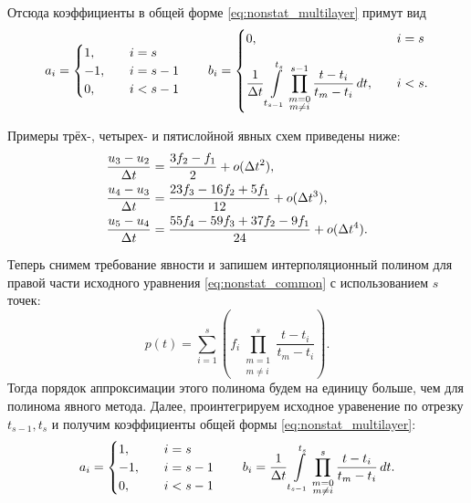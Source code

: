 Отсюда коэффициенты в общей форме \cref{eq:nonstat_multilayer} примут вид
\begin{equation*}
a_i = 
\begin{cases}
1,  &\quad i = s\\
-1, &\quad i = s-1\\
0,  &\quad i < s-1
\end{cases}
\qquad
b_i =
\begin{cases}
0, &\quad i = s\\[10pt]
\displaystyle\frac{1}{\Delta t}\int\limits_{t_{s-1}}^{t_s} \prod \limits_{\substack{m=0\\m\neq i}}^{s-1} \frac{t - t_i}{t_m - t_i}\, dt, &\quad i < s.
\end{cases}
\end{equation*}

Примеры трёх-, четырех- и пятислойной явных схем приведены ниже:
\begin{align*}
&\frac{u_3 - u_2}{\Delta t} = \frac{3f_2 - f_1}{2} + o(\Delta t^2),\\
&\frac{u_4 - u_3}{\Delta t} = \frac{23 f_3 - 16 f_2 + 5 f_1}{12} + o(\Delta t^3),\\
&\frac{u_5 - u_4}{\Delta t} = \frac{55 f_4 - 59 f_3 + 37 f_2 - 9 f_1}{24} + o(\Delta t^4).
\end{align*}

Теперь снимем требование явности и запишем интерполяционный полином для правой части исходного уравнения \cref{eq:nonstat_common} с использованием $s$ точек:
\begin{equation*}
p(t) = \sum\limits_{i=1}^{s}\left(f_i \prod\limits_{\substack{m=1\\m \neq i}}^{s} \frac{t - t_i}{t_m - t_i} \right).
\end{equation*}
Тогда порядок аппроксимации этого полинома будем на единицу больше, чем для полинома явного метода.
Далее, проинтегрируем исходное уравенение по отрезку $t_{s-1}, t_s$ и получим коэффициенты общей формы \cref{eq:nonstat_multilayer}:
\begin{equation*}
a_i = 
\begin{cases}
1,  &\quad i = s\\
-1, &\quad i = s-1\\
0,  &\quad i < s-1
\end{cases}
\qquad
b_i =
\displaystyle\frac{1}{\Delta t}\int\limits_{t_{s-1}}^{t_s} \prod \limits_{\substack{m=0\\m\neq i}}^{s} \frac{t - t_i}{t_m - t_i}\, dt.
\end{equation*}

